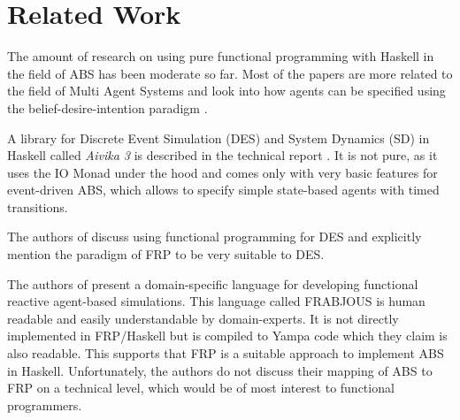 \section{Related Work}
\label{sec:related_work}
The amount of research on using pure functional programming with Haskell in the field of ABS has been moderate so far. Most of the papers are more related to the field of Multi Agent Systems and look into how agents can be specified using the belief-desire-intention paradigm \cite{de_jong_suitability_2014, sulzmann_specifying_2007, jankovic_functional_2007}.

A library for Discrete Event Simulation (DES) and System Dynamics (SD) in Haskell called \textit{Aivika 3} is described in the technical report \cite{sorokin_aivika_2015}. It is not pure, as it uses the IO Monad under the hood and comes only with very basic features for event-driven ABS, which allows to specify simple state-based agents with timed transitions.

The authors of \cite{jankovic_functional_2007} discuss using functional programming for DES and explicitly mention the paradigm of FRP to be very suitable to DES.

The authors of \cite{vendrov_frabjous:_2014} present a domain-specific language for developing functional reactive agent-based simulations. This language called FRABJOUS is human readable and easily understandable by domain-experts. It is not directly implemented in FRP/Haskell but is compiled to Yampa code which they claim is also readable. This supports that FRP is a suitable approach to implement ABS in Haskell. Unfortunately, the authors do not discuss their mapping of ABS to FRP on a technical level, which would be of most interest to functional programmers.
